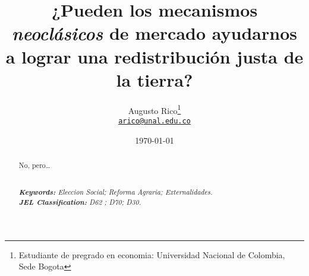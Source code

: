 \documentclass[11pt]{article}
\title{¿Pueden los mecanismos \textit{neoclásicos} de mercado  ayudarnos a lograr una redistribución justa de la tierra?
}
\author{Augusto Rico\thanks{Estudiante de pregrado en economia: Universidad Nacional de Colombia, Sede Bogota}\\
    \href{mailto:arico@unal.edu.co}{\texttt{arico@unal.edu.co}}
    }
\date{\today}
\begin{document}
{ %
\maketitle
\begin{abstract}
\begin{center}No, pero\dots\\~\\\end{center} %
\noindent
\textit{\textbf{Keywords: }%
Eleccion Social; Reforma Agraria; Externalidades.} \\ %
\noindent
\textit{\textbf{JEL Classification: }%
D62	; D70; D30.}\\ %
\noindent


\end{abstract}





}
\end{document}

